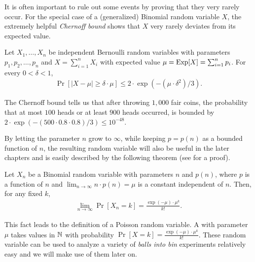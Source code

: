It is often important to rule out some events by proving that they very
rarely occur. For the special case of a (generalized) Binomial random
variable $X$, the extremely helpful \emph{Chernoff bound} shows that $X$
very rarely deviates from its expected value.

\begin{theorem}
Let $X_{1},\ldots,X_{n}$ be independent Bernoulli random variables
with parameters $p_{1},p_{2},\ldots,p_{n}$ and $X=\sum_{i=1}^{n}X_{i}$
with expected value $\mu=\operatorname{Exp}[X]=\sum_{i=1}^{n}p_{i}$. For every $0< \delta < 1$,
\begin{align*}
  \Pr[|X-\mu|\geq \delta\cdot \mu]\leq 2\cdot \exp(-(\mu\cdot \delta^{2})/3).
\end{align*}
\end{theorem}


\begin{example}
  The Chernoff bound tells us that after throwing $1{,}000$ fair coins,
  the probability that at most $100$ heads or at least $900$ heads
  occurred, is bounded by $2\cdot \exp(-(500\cdot 0{.}8\cdot
  0{.}8)/3)\leq 10^{-48}$.
\end{example}


By letting the parameter $n$ grow to $\infty$, while keeping $p=p(n)$ as
a bounded function of $n$, the resulting random variable will also be
useful in the later chapters and is easily described by the following
theorem (see \eg \cite[pp. 98-99]{mitzenmacher2005probability} for a proof). 

\begin{theorem}
  Let $X_{n}$ be a Binomial random variable with parameters $n$ and $p(n)$,
  where $p$ is a function of $n$ and $\lim_{n\to \infty} n\cdot
  p(n)=\mu$ is a constant independent of $n$. Then, for any fixed
  $k$, 
  \begin{align*}
    \lim_{n\to \infty}\Pr[X_{n}=k]=\frac{\exp(-\mu)\cdot \mu^{k}}{k!}. 
  \end{align*}
\end{theorem}

This fact leads to the definition of a Poisson random variable. A
 with parameter $\mu$ takes values in
$\mathbb{N}$ with probability $\Pr[X=k]=\frac{\exp(-\mu)\cdot \mu^{k}}{k!}$. These random
variable can be used to analyze a variety of \emph{balls into bin}
experiments relatively easy and we will make use of them later on. 




